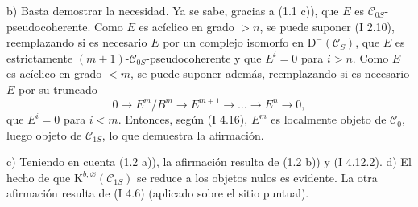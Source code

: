 b) Basta demostrar la necesidad. Ya se sabe, gracias a (1.1 c)), que $E$ es $\mathcal C_{0S}$-pseudocoherente. Como $E$ es acíclico en grado $>n$, se puede suponer (I 2.10), reemplazando si es necesario $E$ por un complejo isomorfo en $\mathrm D^{-}(\mathcal C_S)$, que $E$ es estrictamente $(m+1)$-$\mathcal C_{0S}$-pseudocoherente y que $E^i=0$ para $i>n$. Como $E$ es acíclico en grado $<m$, se puede suponer además, reemplazando si es necesario $E$ por su truncado
\[
0\longrightarrow E^m/B^m\longrightarrow E^{m+1}\longrightarrow\ldots\longrightarrow E^n\longrightarrow0,
\]
que $E^i=0$ para $i<m$. Entonces, según (I 4.16), $E^m$ es localmente objeto de $\mathcal C_0$, luego objeto de $\mathcal C_{1S}$, lo que demuestra la afirmación.

c) Teniendo en cuenta (1.2 a)), la afirmación resulta de (1.2 b)) y (I 4.12.2). d) El hecho de que $\mathrm K^{b,\varnothing}(\mathcal C_{1S})$ se reduce a los objetos nulos es evidente. La otra afirmación resulta de (I 4.6) (aplicado sobre el sitio puntual).

